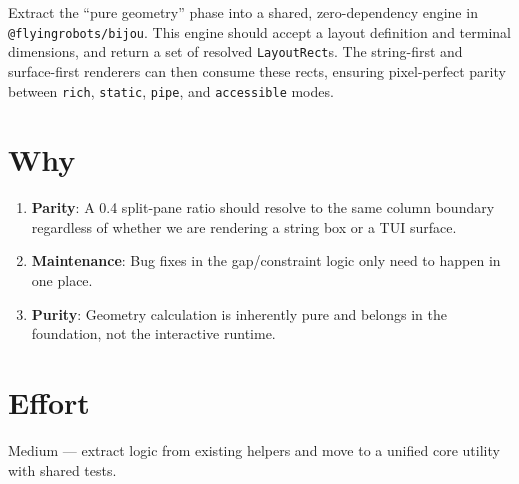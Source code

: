 Extract the ``pure geometry'' phase into a shared, zero-dependency engine in \texttt{@\allowbreak{}f\allowbreak{}l\allowbreak{}y\allowbreak{}i\allowbreak{}n\allowbreak{}g\allowbreak{}r\allowbreak{}o\allowbreak{}b\allowbreak{}o\allowbreak{}t\allowbreak{}s\allowbreak{}/\allowbreak{}b\allowbreak{}i\allowbreak{}j\allowbreak{}o\allowbreak{}u}. This engine should accept a layout definition and terminal dimensions, and return a set of resolved \texttt{L\allowbreak{}a\allowbreak{}y\allowbreak{}o\allowbreak{}u\allowbreak{}t\allowbreak{}R\allowbreak{}e\allowbreak{}c\allowbreak{}t}s. The string-first and surface-first renderers can then consume these rects, ensuring pixel-perfect parity between \texttt{r\allowbreak{}i\allowbreak{}c\allowbreak{}h}, \texttt{s\allowbreak{}t\allowbreak{}a\allowbreak{}t\allowbreak{}i\allowbreak{}c}, \texttt{p\allowbreak{}i\allowbreak{}p\allowbreak{}e}, and \texttt{a\allowbreak{}c\allowbreak{}c\allowbreak{}e\allowbreak{}s\allowbreak{}s\allowbreak{}i\allowbreak{}b\allowbreak{}l\allowbreak{}e} modes.

\section{Why}\label{record-376-why}

\begin{enumerate}
\def\labelenumi{\arabic{enumi}.}
\tightlist
\item
  \textbf{Parity}: A 0.4 split-pane ratio should resolve to the same column boundary regardless of whether we are rendering a string box or a TUI surface.
\item
  \textbf{Maintenance}: Bug fixes in the gap/constraint logic only need to happen in one place.
\item
  \textbf{Purity}: Geometry calculation is inherently pure and belongs in the foundation, not the interactive runtime.
\end{enumerate}

\section{Effort}\label{record-376-effort}

Medium --- extract logic from existing helpers and move to a unified core utility with shared tests.

